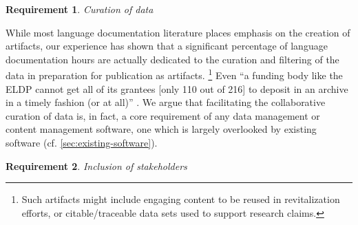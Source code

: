 \documentclass[11pt]{article}
\newtheorem{requirement}{Requirement}
\begin{document}
\begin{requirement}
	\label{req:curation}
       Curation of data
\end{requirement}


While most language documentation literature places emphasis on the creation of
artifacts, our experience has shown that a significant percentage of language
documentation hours are actually dedicated to the curation and filtering of the
data in preparation for publication as artifacts.%
\footnote{Such artifacts might include engaging content to be reused in
    revitalization efforts, or citable/traceable data sets used to support
research claims.}
Even ``a funding body like the ELDP cannot get all of its grantees [only 110
out of 216] to deposit in an archive in a timely fashion (or at all)''
\cite{Thieberger:2012}. We argue that
facilitating the collaborative curation of data is, in fact, a core requirement
of any data management or content management software, one which is largely
overlooked by existing software (cf.
\autoref{sec:existing-software}).


 
 

\begin{requirement}
	\label{req:inclusive}
       Inclusion of stakeholders
\end{requirement}
\end{document}
